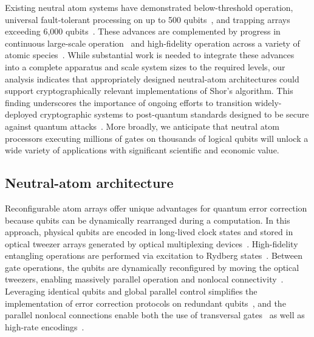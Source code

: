 \documentclass[reprint,twocolumn,secnumarabic,amssymb, aps, prx]{revtex4-2}
\begin{document}
Existing neutral atom systems have demonstrated below-threshold operation, universal fault-tolerant processing on up to 500 qubits~\cite{bluvstein2025architectural}, and trapping arrays exceeding 6,000 qubits~\cite{manetsch2025tweezer}. These advances are complemented by progress in continuous large-scale operation~\cite{gyger2024continuous,norcia2024iterative, chiu2025continuous,holman2026trapping} and high-fidelity operation across a variety of  atomic species~\cite{evered2023high,ma2023high,lis2023midcircuit, tsai2025benchmarking}. While substantial work is needed to integrate these advances into a complete apparatus and scale system sizes to the required levels, our analysis indicates that appropriately designed neutral-atom architectures could support cryptographically relevant implementations of Shor's algorithm. This finding underscores the importance of ongoing efforts to transition widely-deployed cryptographic systems to post-quantum standards designed to be secure against quantum attacks~\cite{FIPS203,FIPS204,FIPS205}. More broadly, we anticipate that neutral atom processors executing millions of gates on thousands of logical qubits will unlock a wide variety of applications with significant scientific and economic value.

\subsection*{Neutral-atom architecture\label{sec:architecture}}
Reconfigurable atom arrays offer unique advantages for quantum error correction because qubits can be dynamically rearranged during a computation. In this approach, physical qubits are encoded in long-lived clock states and stored in optical tweezer arrays generated by optical multiplexing devices~\cite{saffman2010quantum, Barredo2016, endres2016atom, ma2022universal,jenkins2022ytterbium, finkelstein2024universal}. High-fidelity entangling operations are performed via excitation to Rydberg states~\cite{isenhower2010demonstration, ma2023high, tsai2025benchmarking}. Between gate operations, the qubits are dynamically reconfigured by moving the optical tweezers, enabling massively parallel operation and nonlocal connectivity~\cite{Beugnon2007, Schlosser2011, bluvstein2022quantum}. Leveraging identical qubits and global parallel control simplifies the implementation of error correction protocols on redundant qubits~\cite{bluvstein2024logical}, and the parallel nonlocal connections enable both the use of transversal gates~\cite{bluvstein2024logical, cain2024correlated, zhou2024algorithmic, zhou2025resource} as well as high-rate encodings~\cite{bluvstein2024logical,xu2024constant, reichardt2025fault,zhang2025leveraging}. 
\end{document}
